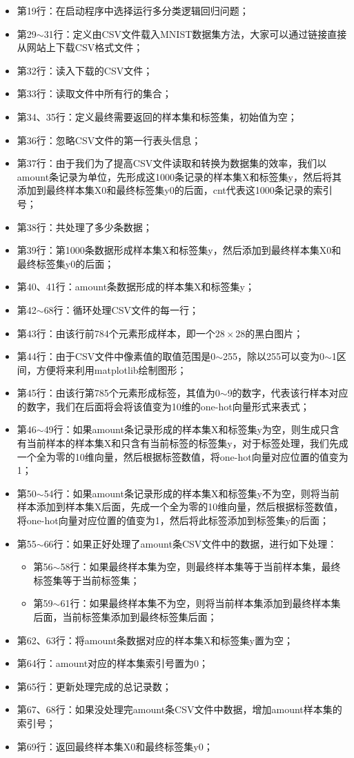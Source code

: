 \documentclass[UTF8]{article}
\begin{document}
\begin{itemize}
\item 第19行：在启动程序中选择运行多分类逻辑回归问题；
\item 第29$\sim$31行：定义由CSV文件载入MNIST数据集方法，大家可以通过链接直接从网站上下载CSV格式文件；
\item 第32行：读入下载的CSV文件；
\item 第33行：读取文件中所有行的集合；
\item 第34、35行：定义最终需要返回的样本集和标签集，初始值为空；
\item 第36行：忽略CSV文件的第一行表头信息；
\item 第37行：由于我们为了提高CSV文件读取和转换为数据集的效率，我们以amount条记录为单位，先形成这1000条记录的样本集X和标签集y，然后将其添加到最终样本集X0和最终标签集y0的后面，cnt代表这1000条记录的索引号；
\item 第38行：共处理了多少条数据；
\item 第39行：第1000条数据形成样本集X和标签集y，然后添加到最终样本集X0和最终标签集y0的后面；
\item 第40、41行：amount条数据形成的样本集X和标签集y；
\item 第42$\sim$68行：循环处理CSV文件的每一行；
\item 第43行：由该行前784个元素形成样本，即一个$28 \times 28$的黑白图片；
\item 第44行：由于CSV文件中像素值的取值范围是0$\sim$255，除以255可以变为0$\sim$1区间，方便将来利用matplotlib绘制图形；
\item 第45行：由该行第785个元素形成标签，其值为0$\sim$9的数字，代表该行样本对应的数字，我们在后面将会将该值变为10维的one-hot向量形式来表式；
\item 第46$\sim$49行：如果amount条记录形成的样本集X和标签集y为空，则生成只含有当前样本的样本集X和只含有当前标签的标签集y，对于标签处理，我们先成一个全为零的10维向量，然后根据标签数值，将one-hot向量对应位置的值变为1；
\item 第50$\sim$54行：如果amount条记录形成的样本集X和标签集y不为空，则将当前样本添加到样本集X后面，先成一个全为零的10维向量，然后根据标签数值，将one-hot向量对应位置的值变为1，然后将此标签添加到标签集y的后面；
\item 第55$\sim$66行：如果正好处理了amount条CSV文件中的数据，进行如下处理：
	\begin{itemize}
	\item 第56$\sim$58行：如果最终样本集为空，则最终样本集等于当前样本集，最终标签集等于当前标签集；
	\item 第59$\sim$61行：如果最终样本集不为空，则将当前样本集添加到最终样本集后面，当前标签集添加到最终标签集后面；
	\end{itemize}
\item 第62、63行：将amount条数据对应的样本集X和标签集y置为空；
\item 第64行：amount对应的样本集索引号置为0；
\item 第65行：更新处理完成的总记录数；
\item 第67、68行：如果没处理完amount条CSV文件中数据，增加amount样本集的索引号；
\item 第69行：返回最终样本集X0和最终标签集y0；
\end{itemize}
\end{document}
